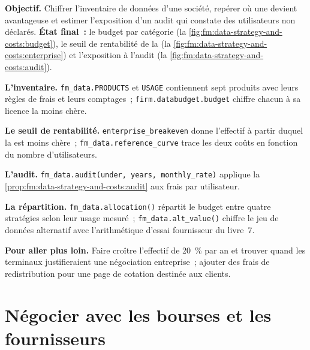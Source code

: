 \begin{tutorial}
\textbf{Objectif.} Chiffrer l'inventaire de données d'une société, repérer où une  devient avantageuse et estimer l'exposition d'un audit qui constate des utilisateurs
non déclarés. \textbf{État final~:} le budget par catégorie (la \cref{fig:fm:data-strategy-and-costs:budget}), le seuil de rentabilité de la 
(la \cref{fig:fm:data-strategy-and-costs:enterprise}) et l'exposition à l'audit (la \cref{fig:fm:data-strategy-and-costs:audit}).
\begin{tutsteps}
\item \textbf{L'inventaire.} \texttt{fm\_data.PRODUCTS} et \texttt{USAGE} contiennent sept produits avec leurs règles de frais et leurs comptages~;
\texttt{firm.databudget.budget} chiffre chacun à sa licence la moins chère.
\item \textbf{Le seuil de rentabilité.} \texttt{enterprise\_breakeven} donne l'effectif à partir duquel la  est moins chère~;
\texttt{fm\_data.reference\_curve} trace les deux coûts en fonction du nombre d'utilisateurs.
\item \textbf{L'audit.} \texttt{fm\_data.audit(under, years, monthly\_rate)} applique la \cref{prop:fm:data-strategy-and-costs:audit} aux
frais par utilisateur.
\item \textbf{La répartition.} \texttt{fm\_data.allocation()} répartit le budget entre quatre stratégies selon leur usage mesuré~;
\texttt{fm\_data.alt\_value()} chiffre le jeu de données alternatif avec l'arithmétique d'essai fournisseur du livre~7.
\end{tutsteps}
\end{tutorial}

\textbf{Pour aller plus loin.} Faire croître l'effectif de 20~\% par an et trouver quand les terminaux justifieraient une négociation entreprise~;
ajouter des frais de redistribution pour une page de cotation destinée aux clients.

\section{Négocier avec les bourses et les fournisseurs}

